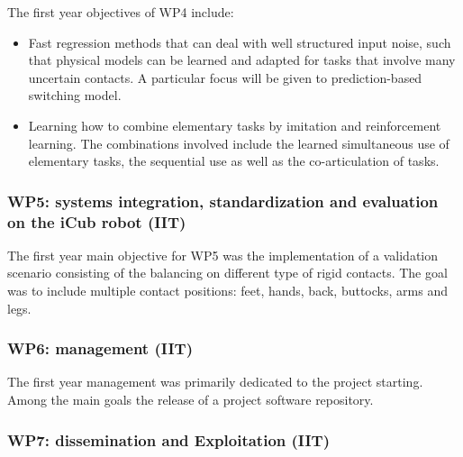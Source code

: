 \documentclass[12pt,a4paper,twoside]{article}
\begin{document}
The first year objectives of WP4 include:
\begin{itemize}
 \item Fast regression methods that can deal with well structured input noise, such that physical models can
be learned and adapted for tasks that involve many uncertain contacts. A particular focus will be given to
prediction-based switching model.
\item Learning how to combine elementary tasks by imitation and reinforcement learning. The combinations involved
include the learned simultaneous use of elementary tasks, the sequential use as well as the co-articulation of
tasks.
\end{itemize}


\subsubsection{WP5: systems integration, standardization and evaluation on the iCub robot (IIT)}

The first year main objective for WP5 was the implementation of a validation scenario consisting of the balancing on different type of rigid contacts. The goal was to include multiple contact positions: feet, hands, back, buttocks, arms and legs. 


\subsubsection{WP6: management (IIT)}

The first year management was primarily dedicated to the project starting. Among the main goals the release of a project software repository.


\subsubsection{WP7: dissemination and Exploitation (IIT)}
\end{document}
